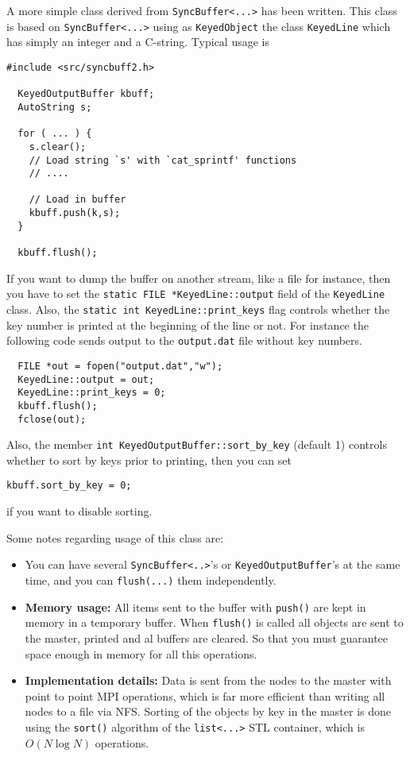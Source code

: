 
A more simple class derived from \verb+SyncBuffer<...>+ has been
written. This class is based on \verb+SyncBuffer<...>+ using as
\verb+KeyedObject+ the class \verb+KeyedLine+ which has simply an
integer and a C-string. Typical usage is
%
\begin{verbatim}
#include <src/syncbuff2.h>

  KeyedOutputBuffer kbuff;
  AutoString s;

  for ( ... ) {
    s.clear();
    // Load string `s' with `cat_sprintf' functions
    // ....

    // Load in buffer
    kbuff.push(k,s);
  }

  kbuff.flush();
\end{verbatim}
%
If you want to dump the buffer on another stream, like a file for
instance, then you have to set the
\verb+static FILE *KeyedLine::output+ field of the \verb+KeyedLine+
class. Also, the \verb+static int KeyedLine::print_keys+ flag controls
whether the key number is printed at the beginning of the line or
not. For instance the following code sends output to the
\verb+output.dat+ file without key numbers. 
%
\begin{verbatim}
  FILE *out = fopen("output.dat","w");
  KeyedLine::output = out;
  KeyedLine::print_keys = 0;
  kbuff.flush();
  fclose(out);
\end{verbatim}
%
Also, the member \verb+int KeyedOutputBuffer::sort_by_key+ (default 1)
controls whether to sort by keys prior to printing, then you can set 
%
\begin{verbatim}
kbuff.sort_by_key = 0;
\end{verbatim}
%
if you want to disable sorting. 

Some notes regarding usage of this class are:

\begin{itemize}
\item You can have several \verb+SyncBuffer<..>+'s or
\verb+KeyedOutputBuffer+'s at the same time, and you can
\verb+flush(...)+ them independently. 

\item \textbf{Memory usage:} All items sent to the buffer with
  \verb+push()+ are kept in memory in a temporary buffer. When
  \verb+flush()+ is called all objects are sent to the master, printed
  and al buffers are cleared. So that you must guarantee space enough
  in memory for all this operations. 

\item \textbf{Implementation details:} Data is sent from the nodes to
  the master with point to point MPI operations, which is far more
  efficient than writing all nodes to a file via NFS. Sorting of the
  objects by key in the master is done using the \verb+sort()+
  algorithm of the \verb+list<...>+ STL container, which is $O(N\log
  N)$ operations. 
\end{itemize}


